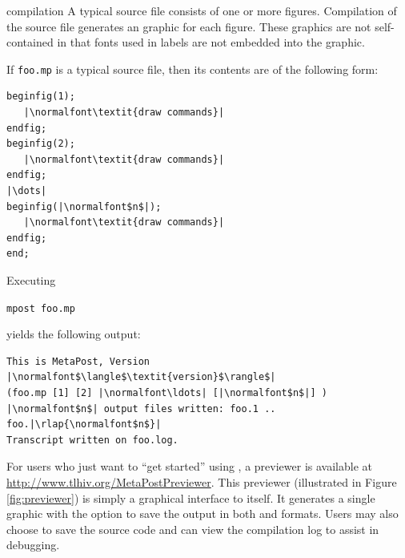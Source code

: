 \begin{section}{\MP{} compilation}
A typical \MP{} source file consists of one or more figures.  Compilation of the source file generates an \EPS{} graphic for each figure.  These \EPS{} graphics are not self-contained in that fonts used in labels are not embedded into the graphic.

If \texttt{foo.mp} is a typical \MP{} source file, then its contents are of the following form:
\begin{lstlisting}[xleftmargin=1.25\parindent]
beginfig(1);
   |\normalfont\textit{draw commands}|
endfig;
beginfig(2);
   |\normalfont\textit{draw commands}|
endfig;
|\dots|
beginfig(|\normalfont$n$|);
   |\normalfont\textit{draw commands}|
endfig;
end;
\end{lstlisting}
Executing \begin{flushleft}\hspace*{1.25\parindent}\texttt{mpost foo.mp}\end{flushleft} yields the following output:
\begin{lstlisting}[xleftmargin=1.25\parindent]
This is MetaPost, Version |\normalfont$\langle$\textit{version}$\rangle$|
(foo.mp [1] [2] |\normalfont\ldots| [|\normalfont$n$|] )
|\normalfont$n$| output files written: foo.1 .. foo.|\rlap{\normalfont$n$}|
Transcript written on foo.log.
\end{lstlisting}

For users who just want to ``get started'' using \MP{}, a \MP{} previewer is available at \url{http://www.tlhiv.org/MetaPostPreviewer}.  This previewer (illustrated in Figure \ref{fig:previewer}) is simply a graphical interface to \MP{} itself.
It generates a single graphic with the option to save the output in both \EPS{} and \PDF{} formats.  Users may also choose to save the source code and can view the compilation log to assist in debugging.
\end{section}
